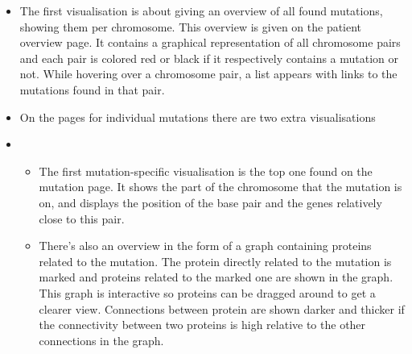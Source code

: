 \begin{itemize}
  \item The first visualisation is about giving an overview of all found mutations, showing them per chromosome. This overview is given on the patient overview page. It contains a graphical representation of all chromosome pairs and each pair is colored red or black if it respectively contains a mutation or not. While hovering over a chromosome pair, a list appears with links to the mutations found in that pair.
  \item On the pages for individual mutations there are two extra visualisations
  \item
  \begin{itemize}
     \item The first mutation-specific visualisation is the top one found on the mutation page. It shows the part of the chromosome that the mutation is on, and displays the position of the base pair and the genes relatively close to this pair.
     \item There's also an overview in the form of a graph containing proteins related to the mutation. The protein directly related to the mutation is marked and proteins related to the marked one are shown in the graph. This graph is interactive so proteins can be dragged around to get a clearer view. Connections between protein are shown darker and thicker if the connectivity between two proteins is high relative to the other connections in the graph.
  \end{itemize}
\end{itemize}